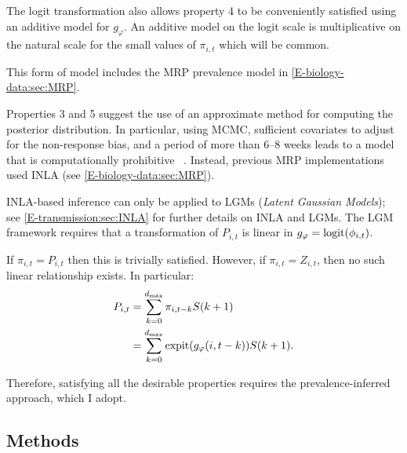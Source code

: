 \documentclass[thesis.tex]{subfiles}
\begin{document}
The logit transformation also allows property 4 to be conveniently satisfied using an additive model for $g_\varphi$.
An additive model on the logit scale is multiplicative on the natural scale for the small values of $\pi_{i,t}$ which will be common.

This form of model includes the MRP prevalence model in \cref{E-biology-data:sec:MRP}.




Properties 3 and 5 suggest the use of an approximate method for computing the posterior distribution.
In particular, using MCMC, sufficient covariates to adjust for the non-response bias, and a period of more than 6--8 weeks leads to a model that is computationally prohibitive ~.
Instead, previous MRP implementations used INLA (see \cref{E-biology-data:sec:MRP}).

INLA-based inference can only be applied to LGMs (\emph{Latent Gaussian Models}); see \cref{E-transmission:sec:INLA} for further details on INLA and LGMs.
The LGM framework requires that a transformation of $P_{i,t}$ is linear in $g_\varphi = \operatorname{logit}(\phi_{i,t})$.

If $\pi_{i,t} = P_{i,t}$ then this is trivially satisfied.
However, if $\pi_{i,t} = Z_{i,t}$, then no such linear relationship exists.
In particular:
\begin{align}
    P_{i,t}
    &= \sum_{k=0}^{d_\text{max}} \pi_{i,t-k} S(k+1) \\
    &= \sum_{k=0}^{d_\text{max}} \operatorname{expit}(g_\varphi(i, t-k)) S(k+1).
\end{align}

Therefore, satisfying all the desirable properties requires the prevalence-inferred approach, which I adopt.

\subsection{Methods} \label{backcalc:sec:methods}
\end{document}
